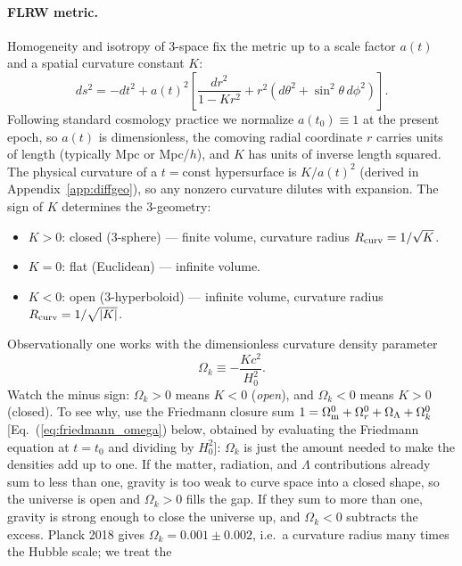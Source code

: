 \documentclass[12pt]{article}
\newcommand{\Omm}{\Omega_{\rm m}}
\begin{document}
\paragraph{FLRW metric.}
Homogeneity and isotropy of 3-space fix the metric up to a scale
factor $a(t)$ and a spatial curvature constant $K$:
%
\begin{equation}
  ds^2 = -dt^2
        + a(t)^2\!\left[\frac{dr^2}{1-Kr^2}
                      + r^2(d\theta^2 + \sin^2\!\theta\,d\phi^2)\right].
  \label{eq:flrw_metric}
\end{equation}
%
Following standard cosmology practice we normalize $a(t_0) \equiv 1$
at the present epoch, so $a(t)$ is dimensionless, the comoving radial
coordinate $r$ carries units of length (typically Mpc or Mpc/$h$),
and $K$ has units of inverse length squared.  The physical curvature
of a $t=\mathrm{const}$ hypersurface is $K/a(t)^2$ (derived in
Appendix~\ref{app:diffgeo}), so any nonzero curvature dilutes with
expansion.  The sign of $K$ determines the
3-geometry:
\begin{itemize}
  \item $K > 0$: closed (3-sphere) --- finite volume, curvature
    radius $R_{\rm curv} = 1/\sqrt{K}$.
  \item $K = 0$: flat (Euclidean) --- infinite volume.
  \item $K < 0$: open (3-hyperboloid) --- infinite volume, curvature
    radius $R_{\rm curv} = 1/\sqrt{|K|}$.
\end{itemize}
Observationally one works with the dimensionless curvature density
parameter
%
\begin{equation}
  \Omega_k \equiv -\frac{Kc^2}{H_0^2}.
\end{equation}
%
Watch the minus sign: $\Omega_k > 0$ means $K < 0$ (\emph{open}), and
$\Omega_k < 0$ means $K > 0$ (closed).  To see why, use the Friedmann
closure sum $1 = \Omm^0 + \Omega_r^0 + \Omega_\Lambda + \Omega_k^0$
[Eq.~(\ref{eq:friedmann_omega}) below, obtained by evaluating the
Friedmann equation at $t=t_0$ and dividing by $H_0^2$]: $\Omega_k$ is just the amount needed to make the
densities add up to one.  If the matter, radiation, and $\Lambda$
contributions already sum to less than one, gravity is too weak to
curve space into a closed shape, so the universe is open and
$\Omega_k > 0$ fills the gap.  If they sum to more than one, gravity
is strong enough to close the universe up, and $\Omega_k < 0$
subtracts the excess.  Planck 2018 gives $\Omega_k = 0.001\pm 0.002$,
i.e.\ a curvature radius many times the Hubble scale; we treat the
\end{document}

